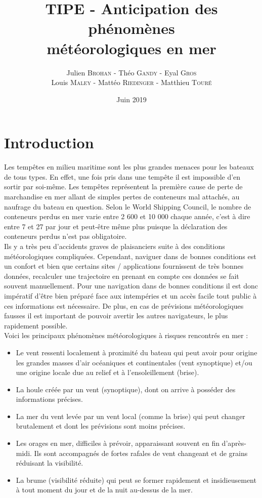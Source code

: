\documentclass[12pt]{report}
\title{TIPE - Anticipation des phénomènes \\météorologiques en mer}
\author{Julien \textsc{Brohan} - Théo \textsc{Gandy} - Eyal \textsc{Gros} \\ Louis \textsc{Maley} -
Mattéo \textsc{Riedinger} - Matthieu \textsc{Touré}}
\date{Juin 2019}
\begin{document}
\maketitle
\setcounter{page}{0}
\tableofcontents
\thispagestyle{empty}
\clearpage

\section*{Introduction}

    Les tempêtes en milieu maritime sont les plus grandes menaces pour les bateaux de tous types. 
    En effet, une fois pris dans une tempête il est impossible d’en sortir par soi-même. 
    Les tempêtes représentent la première cause de perte de marchandise en mer allant de simples 
    pertes de conteneurs mal attachés, au naufrage du bateau en question. 
    Selon le World Shipping Council, le nombre de conteneurs perdus en mer varie entre 2 600 et 10 000
    chaque année, c’est à dire entre 7 et 27 par jour et peut-être même plus puisque la déclaration des
    conteneurs perdus n’est pas obligatoire.\\


    Ils y a très peu d’accidents graves de plaisanciers suite à des conditions météorologiques compliquées. Cependant, naviguer dans de bonnes conditions est un confort et bien que certains sites / applications fournissent de très bonnes données, recalculer une trajectoire en prenant en compte ces données se fait souvent manuellement. 
    Pour une navigation dans de bonnes conditions il est donc impératif d’être bien préparé face aux
    intempéries et un accès facile tout public à ces informations est nécessaire. De plus, en cas de
    prévisions météorologiques fausses il est important de pouvoir avertir les autres navigateurs, le plus rapidement possible.\\
    Voici les principaux phénomènes météorologiques à risques rencontrés en mer :\\


    \begin{itemize}
        \item Le vent ressenti localement à proximité du bateau qui peut avoir pour origine les grandes masses d'air océaniques et continentales (vent synoptique) et/ou une origine locale due au relief et à l'ensoleillement (brise).
        \item La houle créée par un vent (synoptique), dont on arrive à posséder des informations précises.
        \item La mer du vent levée par un vent local (comme la brise) qui peut changer brutalement et dont les prévisions sont moins précises.
        \item Les orages en mer, difficiles à prévoir, apparaissant souvent en fin d'après-midi. Ils sont accompagnés de fortes rafales de vent changeant et de grains réduisant la visibilité.
        \item La brume (visibilité réduite) qui peut se former rapidement et insidieusement à tout moment du jour et de la nuit au-dessus de la mer.\\
    \end{itemize}
\end{document}
